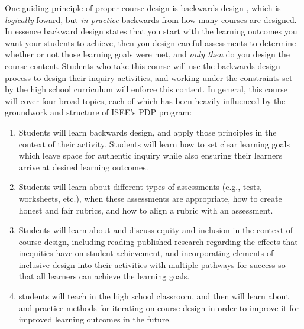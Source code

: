 \documentclass[aasms,11pt, longbibliography]{article}
\begin{document}
One guiding principle of proper course design is backwards design \citep{wiggins&mctighe1998}, which is \emph{logically} foward, but \emph{in practice} backwards from how many courses are designed.
In essence backward design states that you start with the learning outcomes you want your students to achieve, then you design careful assessments to determine whether or not those learning goals were met, and \emph{only then} do you design the course content.
Students who take this course will use the backwards design process to design their inquiry activities, and working under the constraints set by the high school curriculum will enforce this content.
In general, this course will cover four broad topics, each of which has been heavily influenced by the groundwork and structure of ISEE's PDP program:
\begin{enumerate}
\vspace{-9pt}
\item Students will learn backwards design, and apply those principles in the context of their activity.
Students will learn how to set clear learning goals which leave space for authentic inquiry while also ensuring their learners arrive at desired learning outcomes.
\vspace{-9pt}
\item Students will learn about different types of assessments (e.g., tests, worksheets, etc.), when these assessments are appropriate, how to create honest and fair rubrics, and how to align a rubric with an assessment.
\vspace{-9pt}
\item Students will learn about and discuss equity and inclusion in the context of course design, including reading published research regarding the effects that inequities have on student achievement, and incorporating elements of inclusive design into their activities with multiple pathways for success so that all learners can achieve the learning goals.
\vspace{-9pt}
\item students will teach in the high school classroom, and then will learn about and practice methods for iterating on course design in order to improve it for improved learning outcomes in the future.
\vspace{-9pt}
\end{enumerate}
\end{document}
